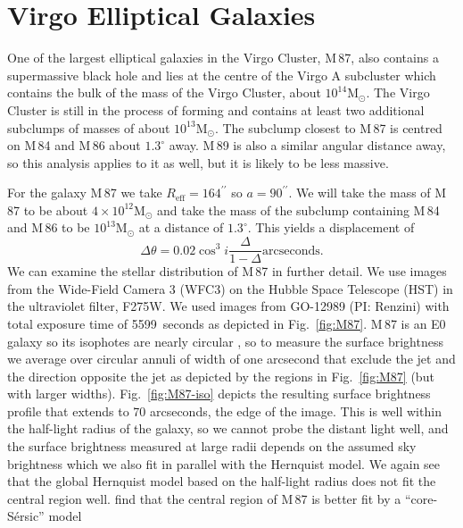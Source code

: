 \documentclass[useAMS,usenatbib]{mn2e}
\newcommand{\msun}{\mathrm{M}_\odot}
\begin{document}
\section{Virgo Elliptical Galaxies}

One of the largest elliptical galaxies in the Virgo Cluster, M\,87,
also contains a supermassive black hole and lies at the centre of the
Virgo A subcluster which contains the bulk of the mass of the Virgo
Cluster, about $10^{14} \msun$.  The Virgo Cluster is still in the
process of forming and contains at least two additional subclumps of
masses of about $10^{13} \msun$.  The subclump closest to M\,87 is
centred on M\,84 and M\,86 about $1.3^\circ$ away.  M\,89 is also a
similar angular distance away, so this analysis applies to it as well,
but it is likely to be less massive.

For the galaxy M\,87 we take $R_\mathrm{eff}=164^{\prime\prime}$
\citep{2006ApJS..164..334F} so $a=90^{\prime\prime}$.  We will take
the mass of M\,87 to be about $4\times 10^{12} \msun$
\citep{2006ApJ...643..210W} and take the mass of the subclump
containing M\,84 and M\,86 to be $10^{13} \msun$ at a distance of
$1.3^\circ$. This yields a displacement of
\begin{equation}
  \Delta \theta = 0.02 \cos^3 i \frac{\Delta}{1-\Delta} 
  \mathrm{arcseconds}.
  \label{eq:13}
\end{equation}
We can examine the stellar distribution of M\,87 in further detail.
We use images from the Wide-Field Camera 3 (WFC3) on the Hubble Space
Telescope (HST) in the ultraviolet filter, F275W.  We used images from
GO-12989 (PI: Renzini) with total exposure time of 5599~seconds as
depicted in Fig.~\ref{fig:M87}.  M\,87 is an E0 galaxy so its
isophotes are nearly circular \citep{2006ApJS..164..334F}, so to
measure the surface brightness we average over circular annuli of
width of one arcsecond that exclude the jet and the direction opposite
the jet as depicted by the regions in Fig.~\ref{fig:M87} (but with
larger widths).  Fig.~\ref{fig:M87-iso} depicts the resulting surface
brightness profile that extends to 70 arcseconds, the edge of the
image.  This is well within the half-light radius of the galaxy, so we
cannot probe the distant light well, and the surface brightness
measured at large radii depends on the assumed sky brightness which we
also fit in parallel with the Hernquist model.  We again see that the
global Hernquist model based on the half-light radius does not fit the
central region well.  \citet{2006ApJS..164..334F} find that the
central region of M\,87 is better fit by a ``core-S\'ersic'' model
\end{document}
